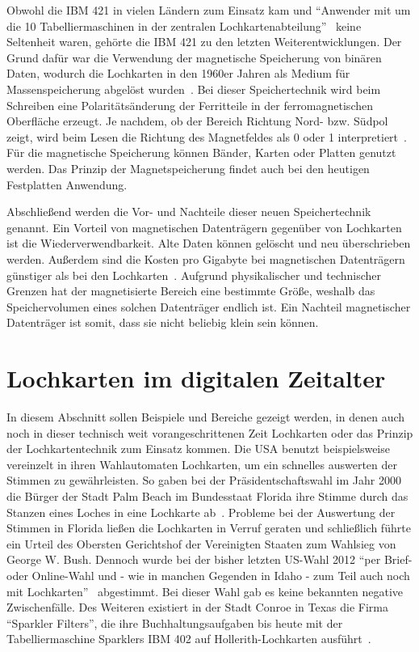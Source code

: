 \documentclass[parskip=half]{scrartcl}
\begin{document}
Obwohl die IBM 421 in vielen Ländern zum Einsatz kam und \enquote{Anwender mit
um die 10 Tabelliermaschinen in der zentralen
Lochkartenabteilung}~\cite{sandner} keine Seltenheit waren, gehörte die IBM 421
zu den letzten Weiterentwicklungen. Der Grund dafür war die Verwendung der
magnetische Speicherung von binären Daten, wodurch die Lochkarten in den 1960er
Jahren als Medium für Massenspeicherung abgelöst wurden~\cite{gronau2009}. Bei
dieser Speichertechnik wird beim Schreiben eine Polaritätsänderung der
Ferritteile in der  ferromagnetischen Oberfläche erzeugt. Je nachdem, ob der
Bereich Richtung Nord- bzw. Südpol zeigt, wird beim Lesen die Richtung des
Magnetfeldes als 0 oder 1 interpretiert~\cite{gronau2009}. Für die magnetische
Speicherung können Bänder, Karten oder Platten genutzt werden. Das Prinzip der
Magnetspeicherung findet auch bei den heutigen Festplatten Anwendung.

Abschließend werden die Vor- und Nachteile dieser neuen Speichertechnik
genannt. Ein Vorteil von magnetischen Datenträgern gegenüber von Lochkarten ist
die Wiederverwendbarkeit. Alte Daten können gelöscht und neu überschrieben
werden. Außerdem sind die Kosten pro Gigabyte bei magnetischen Datenträgern
günstiger als bei den Lochkarten~\cite{Dee}. Aufgrund physikalischer und
technischer Grenzen hat der magnetisierte Bereich eine bestimmte Größe, weshalb
das Speichervolumen eines solchen Datenträger endlich ist. Ein Nachteil
magnetischer Datenträger ist somit, dass sie nicht beliebig klein sein können.

\section{Lochkarten im digitalen Zeitalter}

In diesem Abschnitt sollen Beispiele und Bereiche gezeigt werden, in denen auch
noch in dieser technisch weit vorangeschrittenen Zeit Lochkarten oder das
Prinzip der Lochkartentechnik zum Einsatz kommen. Die USA benutzt
beispielsweise vereinzelt in ihren Wahlautomaten Lochkarten, um ein schnelles
auswerten der Stimmen zu gewährleisten. So gaben bei der Präsidentschaftswahl
im Jahr 2000 die Bürger der Stadt Palm Beach im Bundesstaat Florida ihre Stimme
durch das Stanzen eines Loches in eine Lochkarte ab~\cite{simons}. Probleme bei
der Auswertung der Stimmen in Florida ließen die Lochkarten in Verruf geraten
und schließlich führte ein Urteil des Obersten Gerichtshof der Vereinigten
Staaten zum Wahlsieg von George W. Bush. Dennoch wurde bei der bisher letzten
US-Wahl 2012 \enquote{per Brief- oder Online-Wahl und - wie in manchen Gegenden
in Idaho - zum Teil auch noch mit Lochkarten}~\cite{keinVerfasser} abgestimmt.
Bei dieser Wahl gab es keine bekannten negative Zwischenfälle. Des Weiteren
existiert in der Stadt Conroe in Texas die Firma \enquote{Sparkler Filters},
die ihre Buchhaltungsaufgaben bis heute mit der Tabelliermaschine Sparklers IBM
402 auf Hollerith-Lochkarten ausführt~\cite{edwards}.
\end{document}
